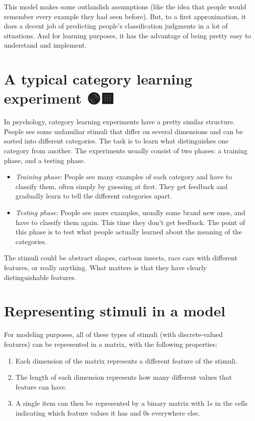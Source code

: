 \documentclass[
  letterpaper,
  DIV=11,
  numbers=noendperiod]{scrreprt}
\providecommand{\tightlist}{%
  \setlength{\itemsep}{0pt}\setlength{\parskip}{0pt}}
\begin{document}
This model makes some outlandish assumptions (like the idea that people
would remember every example they had seen before). But, to a first
approximation, it does a decent job of predicting people's
classification judgments in a lot of situations. And for learning
purposes, it has the advantage of being pretty easy to understand and
implement.

\section{A typical category learning experiment
🟢🟨}\label{a-typical-category-learning-experiment}

In psychology, category learning experiments have a pretty similar
structure. People see some unfamiliar stimuli that differ on several
dimensions and can be sorted into different categories. The task is to
learn what distinguishes one category from another. The experiments
usually consist of two phases: a training phase, and a testing phase.

\begin{itemize}
\tightlist
\item
  \emph{Training phase}: People see many examples of each category and
  have to classify them, often simply by guessing at first. They get
  feedback and gradually learn to tell the different categories apart.
\item
  \emph{Testing phase}: People see more examples, usually some brand new
  ones, and have to classify them again. This time they don't get
  feedback. The point of this phase is to test what people actually
  learned about the meaning of the categories.
\end{itemize}

The stimuli could be abstract shapes, cartoon insects, race cars with
different features, or really anything. What matters is that they have
clearly distinguishable features.

\section{Representing stimuli in a model
🧩}\label{representing-stimuli-in-a-model}

For modeling purposes, all of these types of stimuli (with
discrete-valued features) can be represented in a matrix, with the
following properties:

\begin{enumerate}
\def\labelenumi{\arabic{enumi}.}
\tightlist
\item
  Each dimension of the matrix represents a different feature of the
  stimuli.
\item
  The length of each dimension represents how many different values that
  feature can have.
\item
  A single item can then be represented by a binary matrix with 1s in
  the cells indicating which feature values it has and 0s everywhere
  else.
\end{enumerate}
\end{document}
